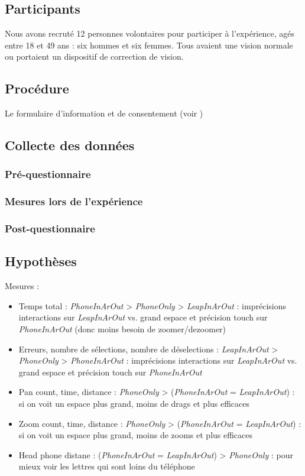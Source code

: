 \subsection{Participants}
Nous avons recruté 12 personnes volontaires pour participer à l'expérience, agés entre 18 et 49 ans : six hommes et six femmes. Tous avaient une vision normale ou portaient un dispositif de correction de vision.

\subsection{Procédure}
Le formulaire d'information et de consentement (voir )

\subsection{Collecte des données}
\subsubsection{Pré-questionnaire}

\subsubsection{Mesures lors de l'expérience}

\subsubsection{Post-questionnaire}

\subsection{Hypothèses}
Mesures :
\begin{itemize}
  \item Temps total : \textit{PhoneInArOut} > \textit{PhoneOnly} > \textit{LeapInArOut} : imprécisions interactions sur \textit{LeapInArOut} vs. grand espace et précision touch sur \textit{PhoneInArOut} (donc moins besoin de zoomer/dezoomer)
  \item Erreurs, nombre de sélections, nombre de déselections : \textit{LeapInArOut} > \textit{PhoneOnly} > \textit{PhoneInArOut} : imprécisions interactions sur \textit{LeapInArOut} vs. grand espace et précision touch sur \textit{PhoneInArOut}
  \item Pan count, time, distance : \textit{PhoneOnly} > (\textit{PhoneInArOut} = \textit{LeapInArOut}) : si on voit un espace plus grand, moins de drags et plus efficaces
  \item Zoom count, time, distance : \textit{PhoneOnly} > (\textit{PhoneInArOut} = \textit{LeapInArOut}) : si on voit un espace plus grand, moins de zooms et plus efficaces
  \item Head phone distane : (\textit{PhoneInArOut} = \textit{LeapInArOut}) > \textit{PhoneOnly} : pour mieux voir les lettres qui sont loins du téléphone
\end{itemize}

